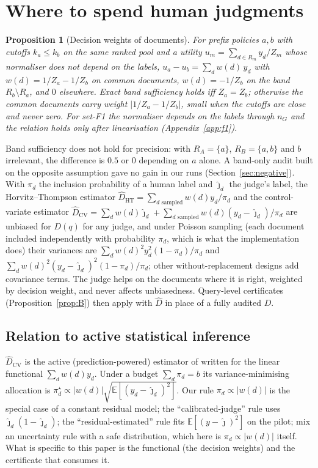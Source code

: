 \documentclass{article}
\newtheorem{proposition}{Proposition}
\begin{document}
\section{Where to spend human judgments}\label{sec:where}
\begin{proposition}[Decision weights of documents]\label{prop:C}
For prefix policies $a,b$ with cutoffs $k_a\le k_b$ on the same ranked pool and a utility $u_m=\sum_{d\in R_m}y_d/Z_m$ whose normaliser does not depend on the labels, $u_a-u_b=\sum_d w(d)\,y_d$ with $w(d)=1/Z_a-1/Z_b$ on common documents, $w(d)=-1/Z_b$ on the band $R_b\setminus R_a$, and $0$ elsewhere. Exact band sufficiency holds iff $Z_a=Z_b$; otherwise the common documents carry weight $|1/Z_a-1/Z_b|$, small when the cutoffs are close and never zero. For set-F1 the normaliser depends on the labels through $n_G$ and the relation holds only after linearisation (Appendix~\ref{app:f1}).
\end{proposition}
Band sufficiency does not hold for precision: with $R_A=\{a\}$, $R_B=\{a,b\}$ and $b$ irrelevant, the difference is $0.5$ or $0$ depending on $a$ alone. A band-only audit built on the opposite assumption gave no gain in our runs (Section~\ref{sec:negative}). With $\pi_d$ the inclusion probability of a human label and $\hat\jmath_d$ the judge's label, the Horvitz--Thompson estimator \citep{horvitz1952} $\hat D_{\mathrm{HT}}=\sum_{d\text{ sampled}}w(d)y_d/\pi_d$ and the control-variate estimator $\hat D_{\mathrm{CV}}=\sum_d w(d)\hat\jmath_d+\sum_{d\text{ sampled}}w(d)(y_d-\hat\jmath_d)/\pi_d$ are unbiased for $D(q)$ for any judge, and under Poisson sampling (each document included independently with probability $\pi_d$, which is what the implementation does) their variances are $\sum_d w(d)^2y_d^2(1-\pi_d)/\pi_d$ and $\sum_d w(d)^2(y_d-\hat\jmath_d)^2(1-\pi_d)/\pi_d$; other without-replacement designs add covariance terms. The judge helps on the documents where it is right, weighted by decision weight, and never affects unbiasedness. Query-level certificates (Proposition~\ref{prop:B}) then apply with $\hat D$ in place of a fully audited $D$.

\subsection{Relation to active statistical inference}\label{sec:relation}
$\hat D_{\mathrm{CV}}$ is the active (prediction-powered) estimator of \citet{zrnic2024active} written for the linear functional $\sum_d w(d)y_d$. Under a budget $\sum_d\pi_d=b$ its variance-minimising allocation is $\pi_d^\star\propto|w(d)|\sqrt{\mathbb E[(y_d-\hat\jmath_d)^2]}$. Our rule $\pi_d\propto|w(d)|$ is the special case of a constant residual model; the ``calibrated-judge'' rule uses $\hat\jmath_d(1-\hat\jmath_d)$; the ``residual-estimated'' rule fits $\mathbb E[(y-\hat\jmath)^2]$ on the pilot; \citet{li2025robust} mix an uncertainty rule with a safe distribution, which here is $\pi_d\propto|w(d)|$ itself. What is specific to this paper is the functional (the decision weights) and the certificate that consumes it.
\end{document}
